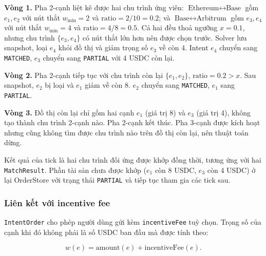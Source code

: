 \textbf{Vòng 1.} Pha 2-cạnh liệt kê được hai chu trình ứng viên:
$\text{Ethereum} \leftrightarrow \text{Base}$ gồm $e_1, e_2$ với nút thắt
$w_{\min} = 2$ và $\mathrm{ratio} = 2/10 = 0.2$; và
$\text{Base} \leftrightarrow \text{Arbitrum}$ gồm $e_3, e_4$ với nút thắt
$w_{\min} = 4$ và $\mathrm{ratio} = 4/8 = 0.5$. Cả hai đều thoả ngưỡng
$x = 0.1$, nhưng chu trình $\{e_3, e_4\}$ có nút thắt lớn hơn nên được chọn
trước. Solver lưu snapshot, loại $e_4$ khỏi đồ thị và giảm trọng số $e_3$ về
còn 4. Intent $e_4$ chuyển sang \texttt{MATCHED}, $e_3$ chuyển sang
\texttt{PARTIAL} với 4 USDC còn lại.

\textbf{Vòng 2.} Pha 2-cạnh tiếp tục với chu trình còn lại $\{e_1, e_2\}$,
$\mathrm{ratio} = 0.2 > x$. Sau snapshot, $e_2$ bị loại và $e_1$ giảm về còn
8. $e_2$ chuyển sang \texttt{MATCHED}, $e_1$ sang \texttt{PARTIAL}.

\textbf{Vòng 3.} Đồ thị còn lại chỉ gồm hai cạnh $e_1$ (giá trị 8) và $e_3$
(giá trị 4), không tạo thành chu trình 2-cạnh nào. Pha 2-cạnh kết thúc. Pha
3-cạnh được kích hoạt nhưng cũng không tìm được chu trình nào trên đồ thị
còn lại, nên thuật toán dừng.

Kết quả của tick là hai chu trình đối ứng được khớp đồng thời, tương ứng với hai
\texttt{MatchResult}. Phần tài sản chưa được khớp ($e_1$ còn 8 USDC, $e_3$ còn 4 USDC)
ở lại OrderStore với trạng thái \texttt{PARTIAL} và tiếp tục tham gia các tick sau.

\subsubsection{Liên kết với incentive fee}

\texttt{IntentOrder} cho phép người dùng gửi kèm \texttt{incentiveFee} tuỳ chọn. 
Trọng số của cạnh khi đó không phải là số USDC ban đầu mà được tính theo:

\[
  w(e) = \mathrm{amount}(e) + \mathrm{incentiveFee}(e).
\]